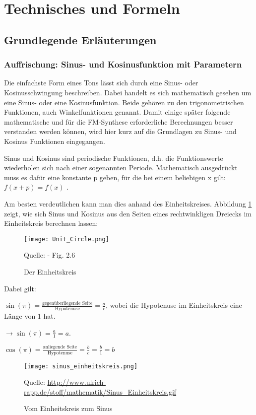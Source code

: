 \section{Technisches und Formeln}
\label{technisches}

\subsection{Grundlegende Erläuterungen}
\subsubsection{Auffrischung: Sinus- und Kosinusfunktion mit Parametern}
Die einfachste Form eines Tons lässt sich durch eine Sinus- oder Kosinusschwingung beschreiben. Dabei handelt es sich mathematisch gesehen um eine Sinus- oder eine Kosinusfunktion. Beide gehören zu den trigonometrischen Funktionen, auch Winkelfunktionen genannt. Damit einige später folgende mathematische und für die FM-Synthese erforderliche Berechnungen besser verstanden werden können, wird hier kurz auf die Grundlagen zu Sinus- und Kosinus Funktionen eingegangen. 

Sinus und Kosinus sind periodische Funktionen, d.h. die Funktionswerte wiederholen sich nach einer sogenannten Periode. Mathematisch ausgedrückt muss es dafür eine konstante p  geben, für die bei einem beliebigen x gilt: $f(x + p) =  f(x)$ .

Am besten verdeutlichen kann man dies anhand des Einheitskreises. Abbildung \ref{fig:unitcircle} zeigt, wie sich Sinus und Kosinus aus den Seiten eines rechtwinkligen Dreiecks im Einheitskreis berechnen lassen:

\begin{figure} [ht]
\centering
\texttt{[image: Unit\_Circle.png]}
\caption{Der Einheitskreis}
\label{fig:unitcircle}
Quelle: \cite{fmtheory} - Fig. 2.6
\end{figure}

Dabei gilt: 

$\sin(\pi) = \frac{\text{gegenüberliegende Seite}}{\text{Hypotenuse}} = \frac{a}{c}$, wobei die Hypotenuse im Einheitskreis eine Länge von 1 hat. 

$\to\sin(\pi) = \frac{a}{1} = a$.

$\cos(\pi) = \frac{\text{anliegende Seite}}{\text{Hypotenuse}} = \frac{b}{c} = \frac{b}{1} = b$ \cite[s. 22 - 27]{fmtheory} \\

\begin{figure} [ht]
\centering
\texttt{[image: sinus\_einheitskreis.png]}
\caption{Vom Einheitskreis zum Sinus}
\label{fig:unitcircleToSinus}
Quelle: \url{http://www.ulrich-rapp.de/stoff/mathematik/Sinus_Einheitskreis.gif}
\end{figure}

